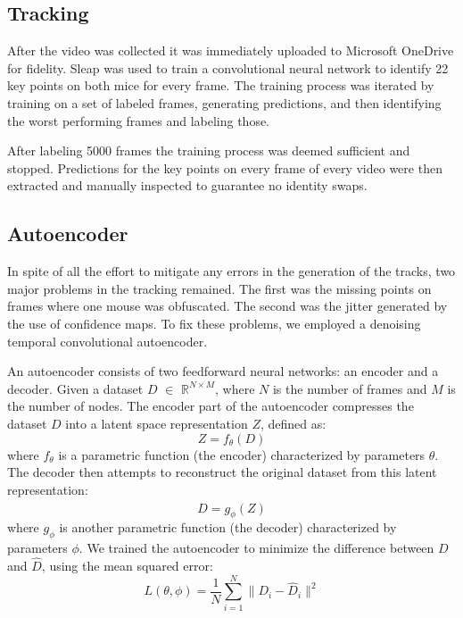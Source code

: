 \documentclass[12pt,english]{article}
\begin{document}
\subsection{Tracking}



After the video was collected it was immediately uploaded to Microsoft OneDrive for fidelity. Sleap \citep{pereiraSLEAPDeepLearning2022} was used to train a convolutional neural network to identify 22 key points on both mice for every frame. The training process was iterated by training on a set of labeled frames, generating predictions, and then identifying the worst performing frames and labeling those. 


After labeling 5000 frames the training process was deemed sufficient and stopped. Predictions for the key points on every frame of every video were then extracted and manually inspected to guarantee no identity swaps. 



\subsection{Autoencoder}

In spite of all the effort to mitigate any errors in the generation of the tracks, two major problems in the tracking remained. The first was the missing points on frames where one mouse was obfuscated. The second was the jitter generated by the use of confidence maps. To fix these problems, we employed a denoising temporal convolutional autoencoder.

An autoencoder consists of two feedforward neural networks: an encoder and a decoder. Given a dataset \( D \) $\in$ \( \mathbb{R}^{N \times M} \), where \( N \) is the number of frames and \( M \) is the number of nodes. The encoder part of the autoencoder compresses the dataset \( D \) into a latent space representation \( Z \), defined as:
\[ Z = f_\theta(D) \]
where \( f_\theta \) is a parametric function (the encoder) characterized by parameters \( \theta \). The decoder then attempts to reconstruct the original dataset from this latent representation:
\[ \hat{D} = g_\phi(Z) \]
where \( g_\phi \) is another parametric function (the decoder) characterized by parameters \( \phi \). We trained the autoencoder to minimize the difference between \( D \) and \( \hat{D} \), using the mean squared error:
\[ L(\theta, \phi) = \frac{1}{N} \sum_{i=1}^{N} \|D_i - \hat{D}_i\|^2 \]
\end{document}
